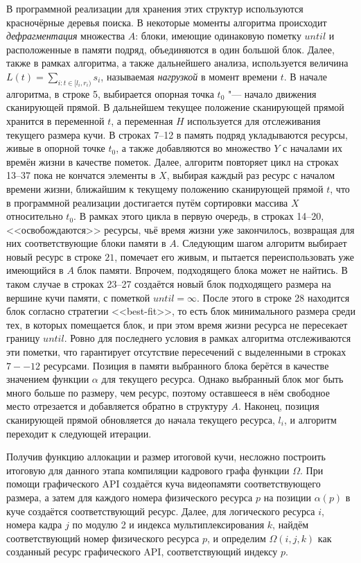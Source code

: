 В программной реализации для хранения этих структур используются красночёрные деревья поиска.
В некоторые моменты алгоритма происходит \textit{дефрагментация} множества $A$: блоки, имеющие одинаковую пометку $until$ и расположенные в памяти подряд, объединяются в один большой блок.
Далее, также в рамках алгоритма, а также дальнейшего анализа, используется величина $L(t) = \sum_{i: t \in [l_i, r_i)} s_i$, называемая \textit{нагрузкой} в момент времени $t$.
В начале алгоритма, в строке 5, выбирается опорная точка $t_0$ "--- начало движения сканирующей прямой.
В дальнейшем текущее положение сканирующей прямой хранится в переменной $t$, а переменная $H$ используется для отслеживания текущего размера кучи.
В строках 7--12 в память подряд укладываются ресурсы, живые в опорной точке $t_0$, а также добавляются во множество $Y$ с началами их времён жизни в качестве пометок.
Далее, алгоритм повторяет цикл на строках 13--37 пока не кончатся элементы в $X$, выбирая каждый раз ресурс с началом времени жизни, ближайшим к текущему положению сканирующей прямой $t$, что в программной реализации достигается путём сортировки массива $X$ относительно $t_0$.
В рамках этого цикла в первую очередь, в строках 14--20, <<освобождаются>> ресурсы, чьё время жизни уже закончилось, возвращая для них соответствующие блоки памяти в $A$.
Следующим шагом алгоритм выбирает новый ресурс в строке $21$, помечает его живым, и пытается переиспользовать уже имеющийся в $A$ блок памяти.
Впрочем, подходящего блока может не найтись.
В таком случае в строках 23--27 создаётся новый блок подходящего размера на вершине кучи памяти, с пометкой $until = \infty$.
После этого в строке 28 находится блок согласно стратегии <<best-fit>>, то есть блок минимального размера среди тех, в которых помещается блок, и при этом время жизни ресурса не пересекает границу $until$.
Ровно для последнего условия в рамках алгоритма отслеживаются эти пометки, что гарантирует отсутствие пересечений с выделенными в строках $7--12$ ресурсами.
Позиция в памяти выбранного блока берётся в качестве значением функции $\alpha$ для текущего ресурса.
Однако выбранный блок мог быть много больше по размеру, чем ресурс, поэтому оставшееся в нём свободное место отрезается и добавляется обратно в структуру $A$.
Наконец, позиция сканирующей прямой обновляется до начала текущего ресурса, $l_i$, и алгоритм переходит к следующей итерации.

Получив функцию аллокации и размер итоговой кучи, несложно построить итоговую для данного этапа компиляции кадрового графа функции $\Omega$.
При помощи графического API создаётся куча видеопамяти соответствующего размера, а затем для каждого номера физического ресурса $p$ на позиции $\alpha(p)$ в куче создаётся соответствующий ресурс.
Далее, для логического ресурса $i$, номера кадра $j$ по модулю 2 и индекса мультиплексирования $k$, найдём соответствующий номер физического ресурса $p$, и определим $\Omega(i, j, k)$ как созданный ресурс графического API, соответствующий индексу $p$.

